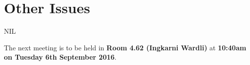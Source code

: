 \documentclass[11pt, a4paper]{article}
\begin{document}
 


\section{Other Issues}

NIL


\vspace*{10pt}

\noindent The next meeting is to be held in {\bf Room 4.62 (Ingkarni Wardli)} at {\bf 10:40am on Tuesday 6th September 2016}.
\end{document}
